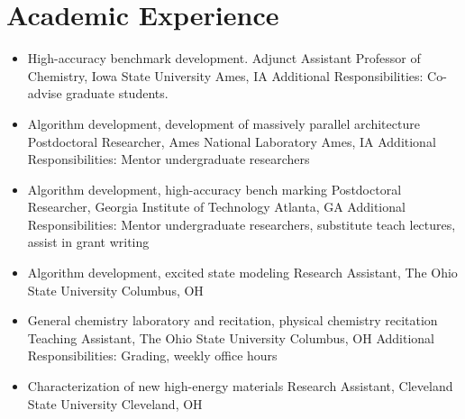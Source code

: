 \documentclass[11pt,a4paper,sans]{moderncv}
\begin{document}

\section{Academic Experience}
\vspace{5pt}
\begin{itemize}
	\item{
	      {High-accuracy benchmark development.}
	      {Adjunct Assistant Professor of Chemistry, Iowa State University}
	      {Ames, IA}
	      {}
	      {Additional Responsibilities: Co-advise graduate students.}}
	\item{
		  {Algorithm development, development of massively parallel
		  	 architecture}
		  {Postdoctoral Researcher, Ames National Laboratory}
		  {Ames, IA}
		  {}
		  {Additional Responsibilities: Mentor undergraduate researchers}}
	\item{
		  {Algorithm development, high-accuracy bench marking}
		  {Postdoctoral Researcher, Georgia Institute of Technology}
		  {Atlanta, GA}
		  {}
		  {Additional Responsibilities: Mentor undergraduate researchers,
		  	 substitute teach lectures, assist in grant writing}}
	\item{
		  {Algorithm development, excited state modeling}
		  {Research Assistant, The Ohio State University}
		  {Columbus, OH}
		  {}
		  {}}
	\item{
		  {General chemistry laboratory and recitation, physical chemistry recitation}
		  {Teaching Assistant, The Ohio State University}
		  {Columbus, OH}
		  {}
		  {Additional Responsibilities: Grading, weekly office hours}}
	\item{
		{Characterization of new high-energy materials}
		{Research Assistant, Cleveland State University}
		{Cleveland, OH}
		{}
		{}}
\end{itemize}
\end{document}
